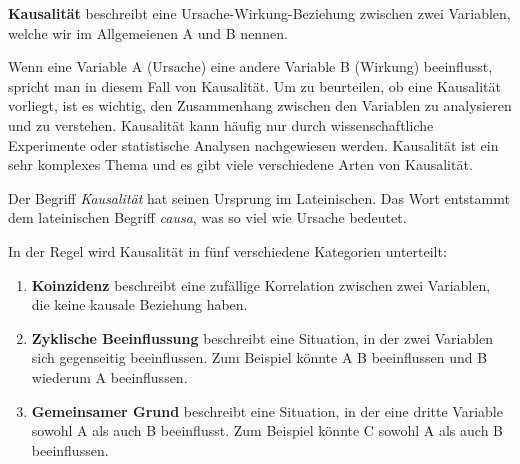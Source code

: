 \begin{mydefinition}[Kausalität]\label{def:kausalitaet}
\textbf{Kausalität} beschreibt eine Ursache-Wirkung-Beziehung zwischen zwei Variablen, welche wir im Allgemeienen A und B nennen.

Wenn eine Variable A (Ursache) eine andere Variable B (Wirkung) beeinflusst, spricht man in diesem Fall von Kausalität. Um zu beurteilen, ob eine Kausalität vorliegt, ist es wichtig, den Zusammenhang zwischen den Variablen zu analysieren und zu verstehen. Kausalität kann häufig nur durch wissenschaftliche  Experimente oder statistische Analysen nachgewiesen werden. Kausalität ist ein sehr komplexes Thema und es gibt viele verschiedene Arten von Kausalität.

Der Begriff \textit{Kausalität} hat seinen Ursprung im Lateinischen. Das Wort entstammt dem lateinischen Begriff \textit{causa}, was so viel wie Ursache bedeutet.

In der Regel wird Kausalität in fünf verschiedene Kategorien unterteilt:
\begin{enumerate}
    \item \textbf{Koinzidenz} beschreibt eine zufällige Korrelation zwischen zwei Variablen, die keine kausale Beziehung haben.
          \begin{center}
          \end{center}

    \item \textbf{Zyklische Beeinflussung} beschreibt eine Situation, in der zwei Variablen sich gegenseitig beeinflussen. Zum Beispiel könnte A B beeinflussen und B wiederum A beeinflussen.
          \begin{center}
          \end{center}

    \item \textbf{Gemeinsamer Grund} beschreibt eine Situation, in der eine dritte Variable sowohl A als auch B beeinflusst. Zum Beispiel könnte C sowohl A als auch B beeinflussen.
          \begin{center}
          \end{center}


\end{enumerate}
\end{mydefinition}
